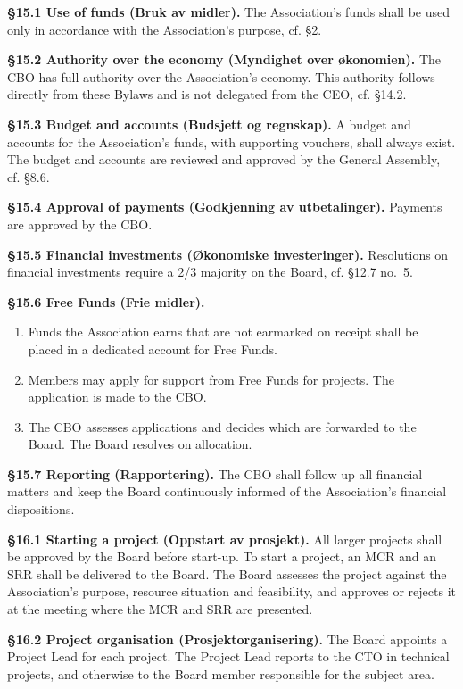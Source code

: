 \documentclass{../../../Common/Latex/Templates/rapport}
\begin{document}
\textbf{\S 15.1 Use of funds (Bruk av midler).} The Association's funds shall be used only in accordance with the Association's purpose, cf. \S2.

\textbf{\S 15.2 Authority over the economy (Myndighet over økonomien).} The CBO has full authority over the Association's economy. This authority follows directly from these Bylaws and is not delegated from the CEO, cf. \S14.2.

\textbf{\S 15.3 Budget and accounts (Budsjett og regnskap).} A budget and accounts for the Association's funds, with supporting vouchers, shall always exist. The budget and accounts are reviewed and approved by the General Assembly, cf. \S8.6.

\textbf{\S 15.4 Approval of payments (Godkjenning av utbetalinger).} Payments are approved by the CBO.

\textbf{\S 15.5 Financial investments (Økonomiske investeringer).} Resolutions on financial investments require a 2/3 majority on the Board, cf. \S12.7 no.\ 5.

\textbf{\S 15.6 Free Funds (Frie midler).}
\begin{enumerate}
  \item Funds the Association earns that are not earmarked on receipt shall be placed in a dedicated account for Free Funds.
  \item Members may apply for support from Free Funds for projects. The application is made to the CBO.
  \item The CBO assesses applications and decides which are forwarded to the Board. The Board resolves on allocation.
\end{enumerate}

\textbf{\S 15.7 Reporting (Rapportering).} The CBO shall follow up all financial matters and keep the Board continuously informed of the Association's financial dispositions.

\textbf{\S 16.1 Starting a project (Oppstart av prosjekt).} All larger projects shall be approved by the Board before start-up. To start a project, an MCR and an SRR shall be delivered to the Board. The Board assesses the project against the Association's purpose, resource situation and feasibility, and approves or rejects it at the meeting where the MCR and SRR are presented.

\textbf{\S 16.2 Project organisation (Prosjektorganisering).} The Board appoints a Project Lead for each project. The Project Lead reports to the CTO in technical projects, and otherwise to the Board member responsible for the subject area.
\end{document}
